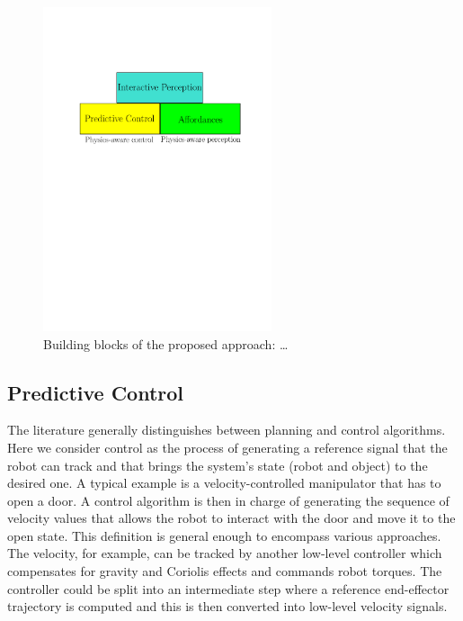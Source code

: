 \begin{figure}[h]
\centering
\includegraphics[width=0.6\textwidth]{images/blocks.pdf}
\caption{Building blocks of the proposed approach: \ldots}
\end{figure}

\subsection{Predictive Control}\label{sec:pred_control}
The literature generally distinguishes between planning and control algorithms. Here we consider control as the process of generating a reference signal that the robot can track and that brings the system's state (robot and object) to the desired one. A typical example is a velocity-controlled manipulator that has to open a door. A control algorithm is then in charge of generating the sequence of velocity values that allows the robot to interact with the door and move it to the open state. This definition is general enough to encompass various approaches. The velocity, for example, can be tracked by another low-level controller which compensates for gravity and Coriolis effects and commands robot torques. The controller could be split into an intermediate step where a reference end-effector trajectory is computed and this is then converted into low-level velocity signals.


